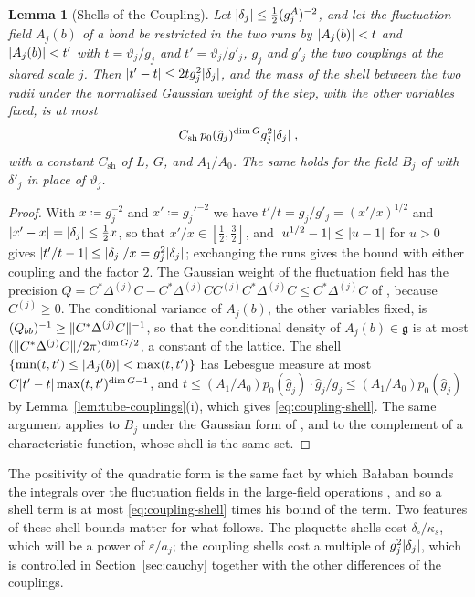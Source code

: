 \documentclass[11pt]{preprint}
\DeclarePairedDelimiter{\abs}{\lvert}{\rvert}
\DeclarePairedDelimiter{\norm}{\lVert}{\rVert}
\numberwithin{equation}{section}
\newtheorem{lemma}[theorem]{Lemma}
\theoremstyle{definition}
\theoremstyle{remark}
\theoremstyle{plain}
\begin{document}
\begin{lemma}[Shells of the Coupling]\label{lem:coupling-shells}
Let $\abs{\delta_j} \leq \frac12(g^A_j)^{-2}$, and let the fluctuation field $A_j(b)$ of a bond be restricted in the two runs by $\abs{A_j(b)} < t$ and $\abs{A_j(b)} < t'$ with $t = \vartheta_j/g_j$ and $t' = \vartheta_j/g'_j$, $g_j$ and $g'_j$ the two couplings at the shared scale $j$. Then $\abs{t' - t} \leq 2tg_j^2\abs{\delta_j}$, and the mass of the shell between the two radii under the normalised Gaussian weight of the step, with the other variables fixed, is at most
\begin{equation}\label{eq:coupling-shell}
    C_{\mathrm{sh}}\,p_0(\hat g_j)^{\dim G}g_j^2\abs{\delta_j}\;,
\end{equation}
with a constant $C_{\mathrm{sh}}$ of $L$, $G$, and $A_1/A_0$. The same holds for the field $B_j$ of \cite[(1.55), p.~188]{BalabanLFR1} with $\delta'_j$ in place of $\vartheta_j$.
\end{lemma}

\begin{proof}
With $x \coloneqq g_j^{-2}$ and $x' \coloneqq g_j'^{-2}$ we have $t'/t = g_j/g'_j = (x'/x)^{1/2}$ and $\abs{x' - x} = \abs{\delta_j} \leq \frac12x$, so that $x'/x \in [\frac12, \frac32]$, and $\abs{u^{1/2} - 1} \leq \abs{u - 1}$ for $u > 0$ gives $\abs{t'/t - 1} \leq \abs{\delta_j}/x = g_j^2\abs{\delta_j}$; exchanging the runs gives the bound with either coupling and the factor $2$. The Gaussian weight of the fluctuation field has the precision $Q = C^*\Delta^{(j)}C - C^*\Delta^{(j)}CC^{(j)}C^*\Delta^{(j)}C \leq C^*\Delta^{(j)}C$ of \cite[(2.21), p.~258]{BalabanCRE}, because $C^{(j)} \geq 0$. The conditional variance of $A_j(b)$, the other variables fixed, is $(Q_{bb})^{-1} \geq \norm{C^*\Delta^{(j)}C}^{-1}$, so that the conditional density of $A_j(b) \in \mathfrak g$ is at most $(\norm{C^*\Delta^{(j)}C}/2\pi)^{\dim G/2}$, a constant of the lattice. The shell $\{ \min(t, t') \leq \abs{A_j(b)} < \max(t, t') \}$ has Lebesgue measure at most $C\abs{t' - t}\max(t, t')^{\dim G - 1}$, and $t \leq (A_1/A_0)p_0(\hat g_j)\cdot\hat g_j/g_j \leq (A_1/A_0)p_0(\hat g_j)$ by Lemma~\ref{lem:tube-couplings}(i), which gives \eqref{eq:coupling-shell}. The same argument applies to $B_j$ under the Gaussian form of \cite[p.~188]{BalabanLFR1}, and to the complement of a characteristic function, whose shell is the same set.
\end{proof}

The positivity of the quadratic form is the same fact by which Ba{\l}aban bounds the integrals over the fluctuation fields in the large-field operations \cite[p.~383]{BalabanLFR2}, and so a shell term is at most \eqref{eq:coupling-shell} times his bound of the term. Two features of these shell bounds matter for what follows. The plaquette shells cost $\delta_\square/\kappa_s$, which will be a power of $\varepsilon/a_j$; the coupling shells cost a multiple of $g_j^2\abs{\delta_j}$, which is controlled in Section~\ref{sec:cauchy} together with the other differences of the couplings.
\end{document}
